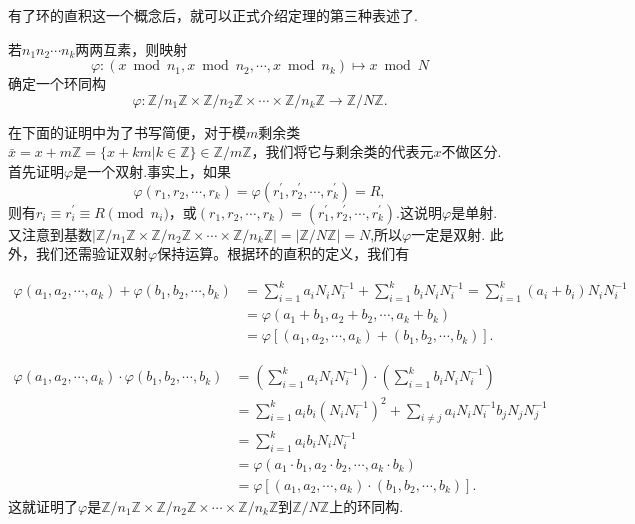 \documentclass[color=green,mathpazo,titlestyle=hang]{elegantbook}
\begin{document}
  有了环的直积这一个概念后，就可以正式介绍定理的第三种表述了.

  
  \begin{newthem}[中国剩余定理III]
  	若$n_1n_2\cdots n_k$两两互素，则映射
  	\[
  	\varphi:(x\bmod n_1,x\bmod n_2,\cdots,x\bmod n_k)\mapsto x\bmod N
  	\]
  	确定一个环同构
  	\[
  	\varphi:\mathbb{Z}/n_1\mathbb{Z}\times\mathbb{Z}/n_2\mathbb{Z}\times\cdots\times\mathbb{Z}/n_k\mathbb{Z}\rightarrow\mathbb{Z}/N\mathbb{Z}.
  	\]
  

  \end{newthem}


  \begin{newproof}
	在下面的证明中为了书写简便，对于模$m$剩余类$\bar{x}=x+m\mathbb{Z}=\{x+km|k\in\mathbb{Z}\}\in \mathbb{Z}/m\mathbb{Z}$，我们将它与剩余类的代表元$x$不做区分. 首先证明$\varphi$是一个双射.事实上，如果
	\[
	\varphi(r_1,r_2,\cdots,r_k)=\varphi(r_1^{'},r_2^{'},\cdots,r_k^{'})=R,
	\]
	则有$r_i\equiv r_i^{'}\equiv R \pmod{n_i} $，或$(r_1,r_2,\cdots,r_k)=(r_1^{'},r_2^{'},\cdots,r_k^{'}).$这说明$\varphi$是单射.
	又注意到基数$\left|\mathbb{Z}/n_1\mathbb{Z}\times\mathbb{Z}/n_2\mathbb{Z}\times\cdots\times\mathbb{Z}/n_k\mathbb{Z}\right|=\left|\mathbb{Z}/N\mathbb{Z}\right|=N$,所以$\varphi$一定是双射.
	此外，我们还需验证双射$\varphi$保持运算。根据环的直积的定义，我们有
	
	\begin{equation*}	
	\begin{aligned}
	\varphi(a_1,a_2,\cdots,a_k)+\varphi(b_1,b_2,\cdots,b_k)	
	&=\sum_{i=1}^{k}a_iN_i N_i^{-1}+\sum_{i=1}^{k}b_iN_i N_i^{-1}=\sum_{i=1}^{k}(a_i+b_i)N_i N_i^{-1}\\
	&=\varphi(a_1+b_1,a_2+b_2,\cdots,a_k+b_k)\\
	&=\varphi[(a_1,a_2,\cdots,a_k)+(b_1,b_2,\cdots,b_k)].
	\end{aligned}		
	\end{equation*}
	
	\begin{equation*}	
	\begin{aligned}
	\varphi(a_1,a_2,\cdots,a_k)\cdot\varphi(b_1,b_2,\cdots,b_k)	
	&=\left(\sum_{i=1}^{k}a_iN_i N_i^{-1}\right)\cdot\left(\sum_{i=1}^{k}b_iN_i N_i^{-1}\right)\\
	&=\sum_{i=1}^{k}a_i b_i (N_i N_i^{-1})^2+\sum_{i\ne j}a_iN_i N_i^{-1}b_jN_j N_j^{-1}\\
	&=\sum_{i=1}^{k}a_i b_i N_i N_i^{-1}\\
	&=\varphi(a_1\cdot b_1,a_2\cdot b_2,\cdots,a_k\cdot b_k)\\
	&=\varphi[(a_1,a_2,\cdots,a_k)\cdot(b_1,b_2,\cdots,b_k)].
	\end{aligned}		
	\end{equation*}  
    这就证明了$\varphi$是$\mathbb{Z}/n_1\mathbb{Z}\times\mathbb{Z}/n_2\mathbb{Z}\times\cdots\times\mathbb{Z}/n_k\mathbb{Z}$到$\mathbb{Z}/N\mathbb{Z}$上的环同构.

  \end{newproof}



\end{document}
